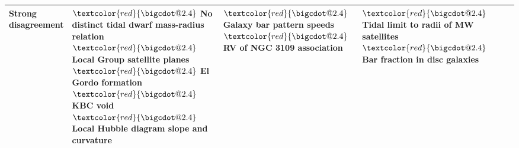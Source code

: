 \documentclass[fleqn,usenatbib,useAMS]{mnras} %
\makeatletter
\DeclareRobustCommand*\bigcdot{\mathpalette\bigcdot@{2.4}}
\DeclareRobustCommand*\bigcdot@[2]{\mathbin{\vcenter{\hbox{\scalebox{#2}{$\m@th#1\bullet$}}}}}
\makeatother
\begin{document}
\begin{table}
\begin{tabular}{llllll}
		\makecell{Strong \\ disagreement} & \makecell{$\textcolor{red}{\bigcdot}$ No distinct \\ tidal dwarf \\ mass-radius \\ relation \\ $\textcolor{red}{\bigcdot}$ Local Group \\ satellite planes \\ $\textcolor{red}{\bigcdot}$ El Gordo \\ formation \\ $\textcolor{red}{\bigcdot}$ KBC void \\ $\textcolor{red}{\bigcdot}$ Local Hubble \\ diagram slope \\ and curvature} & \makecell{$\textcolor{red}{\bigcdot}$ Galaxy bar \\ pattern speeds \\ $\textcolor{red}{\bigcdot}$ RV of NGC \\ 3109 association} & \makecell{$\textcolor{red}{\bigcdot}$ Tidal limit \\ to radii of \\ MW satellites \\ $\textcolor{red}{\bigcdot}$ Bar fraction \\ in disc galaxies} & \makecell{} & \makecell{} \\ \hline
	\end{tabular}
	\label{LCDM_overview}
\end{table}
\end{document}
